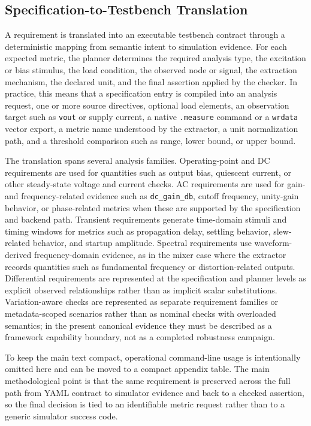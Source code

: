 \subsection{Specification-to-Testbench Translation}
A requirement is translated into an executable testbench contract through a deterministic mapping from semantic intent to simulation evidence. For each expected metric, the planner determines the required analysis type, the excitation or bias stimulus, the load condition, the observed node or signal, the extraction mechanism, the declared unit, and the final assertion applied by the checker. In practice, this means that a specification entry is compiled into an analysis request, one or more source directives, optional load elements, an observation target such as \texttt{vout} or supply current, a native \texttt{.measure} command or a \texttt{wrdata} vector export, a metric name understood by the extractor, a unit normalization path, and a threshold comparison such as range, lower bound, or upper bound.

The translation spans several analysis families. Operating-point and DC requirements are used for quantities such as output bias, quiescent current, or other steady-state voltage and current checks. AC requirements are used for gain- and frequency-related evidence such as \texttt{dc\_gain\_db}, cutoff frequency, unity-gain behavior, or phase-related metrics when these are supported by the specification and backend path. Transient requirements generate time-domain stimuli and timing windows for metrics such as propagation delay, settling behavior, slew-related behavior, and startup amplitude. Spectral requirements use waveform-derived frequency-domain evidence, as in the mixer case where the extractor records quantities such as fundamental frequency or distortion-related outputs. Differential requirements are represented at the specification and planner levels as explicit observed relationships rather than as implicit scalar substitutions. Variation-aware checks are represented as separate requirement families or metadata-scoped scenarios rather than as nominal checks with overloaded semantics; in the present canonical evidence they must be described as a framework capability boundary, not as a completed robustness campaign.

To keep the main text compact, operational command-line usage is intentionally omitted here and can be moved to a compact appendix table. The main methodological point is that the same requirement is preserved across the full path from YAML contract to simulator evidence and back to a checked assertion, so the final decision is tied to an identifiable metric request rather than to a generic simulator success code.

